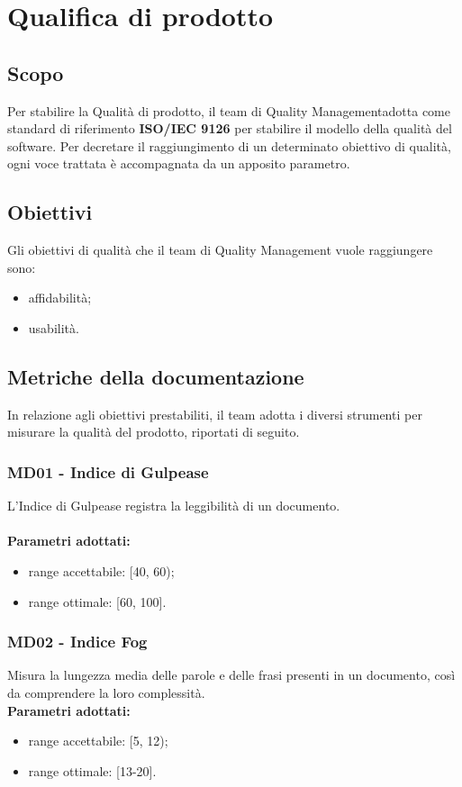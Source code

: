 \section{Qualifica di prodotto}
\subsection{Scopo}
Per stabilire la Qualità di prodotto, il team di Quality Management\glo adotta come standard di riferimento \textbf{ISO/IEC 9126} per stabilire il modello della qualità del software. Per decretare il raggiungimento di un determinato obiettivo di qualità, ogni voce trattata è accompagnata da un apposito parametro.
\subsection{Obiettivi}
Gli obiettivi di qualità che il team di Quality Management vuole raggiungere sono:
\begin{itemize}
\item affidabilità;
\item usabilità.
\end{itemize}
\subsection{Metriche della documentazione}
In relazione agli obiettivi prestabiliti, il team adotta i diversi strumenti per misurare la qualità del prodotto, riportati di seguito.
\subsubsection{MD01 - Indice di Gulpease}
L'Indice di Gulpease registra la leggibilità di un documento. \\ \\ 
\textbf{Parametri adottati:} 
\begin{itemize}
\item range accettabile: [40, 60);
\item range ottimale: [60, 100].
\end{itemize}

\subsubsection{MD02 - Indice Fog}
Misura la lungezza media delle parole e delle frasi presenti in un documento, così da comprendere la loro complessità.\\
\textbf{Parametri adottati:} 
\begin{itemize}
\item range accettabile: [5, 12);
\item range ottimale: [13-20].
\end{itemize}

